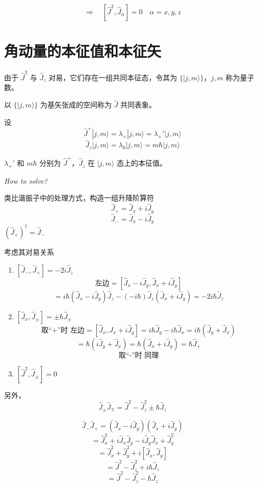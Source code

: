 \documentclass[lang=cn,10pt]{elegantbook}
\begin{document}
\[
\Rightarrow \quad [\hat{J}^2, \hat{J}_\alpha] = 0 \quad \alpha = x, y, z
\]

\section{角动量的本征值和本征矢}
由于 \(\hat{J}^2\) 与 \(\hat{J}_z\) 对易，它们存在一组共同本征态，令其为 \(\{|j, m\rangle\}\)，\(j, m\) 称为量子数。

以 \(\{|j, m\rangle\}\) 为基矢张成的空间称为 \(\hat{J}\) 共同表象。

设
\[
\hat{J}^+ |j, m\rangle = \lambda_+ |j, m\rangle = \lambda_+' |j, m\rangle
\]
\[
\hat{J}_z |j, m\rangle = \lambda_0 |j, m\rangle = m \hbar |j, m\rangle
\]

\(\lambda_+'\) 和 \(m\hbar\) 分别为 \(\hat{J}^+\)，\(\hat{J}_z\) 在 \(|j, m\rangle\) 态上的本征值。

\textit{How to solve?}

类比谐振子中的处理方式，构造一组升降阶算符
\[
\hat{J}_+ = \hat{J}_x + i\hat{J}_y
\]
\[
\hat{J}_- = \hat{J}_x - i\hat{J}_y
\]
$(\hat{J}_+)^\dagger = \hat{J}_-$

考虑其对易关系

\begin{enumerate}
	\item \([\hat{J}_-, \hat{J}_+] = -2i\hat{J}_z\)
	\[
	\text{左边} = [\hat{J}_x - i\hat{J}_y, \hat{J}_x + i\hat{J}_y]
	\]
	\[
	= i\hbar(\hat{J}_x - i\hat{J}_y)\hat{J}_z - (-i\hbar)\hat{J}_z(\hat{J}_x + i\hat{J}_y) = -2i\hbar\hat{J}_z
	\]
	
	\item \([\hat{J}_x, \hat{J}_\pm] = \pm\hbar\hat{J}_\pm\)
	\[
	\text{取“+”时 左边} = [\hat{J}_x, \hat{J}_x + i\hat{J}_y] = i\hbar\hat{J}_y - i\hbar\hat{J}_x = i\hbar(\hat{J}_y + \hat{J}_x)
	\]
	\[
	= \hbar(i\hat{J}_y + \hat{J}_x) = \hbar(\hat{J}_x + i\hat{J}_y) = \hbar\hat{J}_+
	\]
	\[
	\text{取“-”时 同理}
	\]
	
	\item \([\hat{J}^2, \hat{J}_\pm] = 0\)
\end{enumerate}
另外，
\[
\hat{J}_\pm \hat{J}_\mp = \hat{J}^2 - \hat{J}_z^2 \pm \hbar \hat{J}_z
\]

\[
\hat{J}_- \hat{J}_+ = (\hat{J}_x - i\hat{J}_y)(\hat{J}_x + i\hat{J}_y)
\]
\[
= \hat{J}_x^2 + i\hat{J}_x\hat{J}_y - i\hat{J}_y\hat{J}_x + \hat{J}_y^2
\]
\[
= \hat{J}_x^2 + \hat{J}_y^2 + i[\hat{J}_x, \hat{J}_y]
\]
\[
= \hat{J}^2 - \hat{J}_z^2 + i\hbar \hat{J}_z
\]
\[
= \hat{J}^2 - \hat{J}_z^2 - \hbar \hat{J}_z
\]
\end{document}
